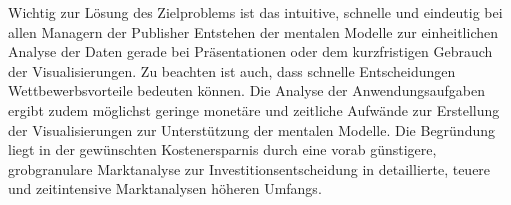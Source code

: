 \documentclass[usegeometry=true]{scrartcl}
\begin{document}
Wichtig zur Lösung des Zielproblems ist das intuitive, schnelle und eindeutig bei allen Managern der Publisher Entstehen der mentalen Modelle zur einheitlichen Analyse der Daten gerade bei Präsentationen oder dem kurzfristigen Gebrauch der Visualisierungen.
Zu beachten ist auch, dass schnelle Entscheidungen Wettbewerbsvorteile bedeuten können.
Die Analyse der Anwendungsaufgaben ergibt zudem möglichst geringe monetäre und zeitliche Aufwände zur Erstellung der Visualisierungen zur Unterstützung der mentalen Modelle.
Die Begründung liegt in der gewünschten Kostenersparnis durch eine vorab günstigere, grobgranulare Marktanalyse zur Investitionsentscheidung in detaillierte, teuere und zeitintensive Marktanalysen höheren Umfangs.


\end{document}

